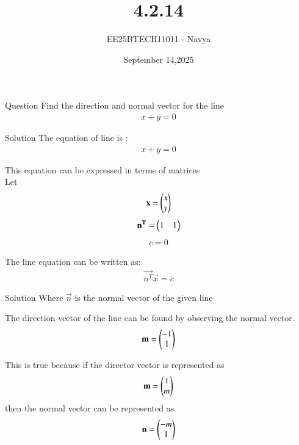 \documentclass{beamer}
\title{4.2.14}
\date{September 14,2025}
\author{EE25BTECH11011 - Navya}
\begin{document}
\frame{\titlepage}

\begin{frame}{Question}
Find the direction and normal vector for the line 
\begin{align}
x + y = 0
\end{align}
\end{frame}

\begin{frame}{Solution}
The equation of line is :
\begin{align}
x + y = 0
\end{align}

This equation can be expressed in terms of matrices\\
Let
\begin{align}
\mathbf{x} = \begin{pmatrix}x \\ y\end{pmatrix}
\end{align}
\begin{align}
\mathbf{n^T} = \begin{pmatrix}1 & 1\end{pmatrix}
\end{align}
\begin{align}
c = 0
\end{align}

The line equation can be written as:
\begin{align}
\vec{n^T}  \vec{x} = c
\end{align}

\end{frame}

\begin{frame}{Solution}
Where $\vec{n}$ is the normal vector of the given line

The direction vector of the line can be found by observing the normal vector.
\begin{align}
\mathbf{m} = \begin{pmatrix}-1 \\ 1\end{pmatrix}
\end{align}


This is true because if the director vector is represented as 
\begin{align}
\mathbf{m}  = \begin{pmatrix}1 \\ m\end{pmatrix}    
\end{align}
then the normal vector can be represented as 
\begin{align}
\mathbf{n} = \begin{pmatrix}-m \\ 1\end{pmatrix}
\end{align}
\end{frame}
\end{document}
